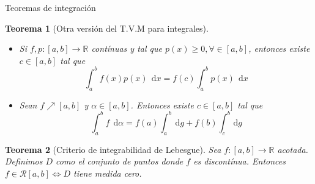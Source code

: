 \documentclass[a4paper]{article}\usepackage{/home/alonso/Documents/Projects/formularios/styles}
\theoremstyle{mytheoremstyle}
\newtheorem{theorem}{Teorema}
\newcommand{\R}{\mathbb{R}}
\newcommand{\1}{\mathds{1}}
\newcommand{\diff}[1]{\,\mathrm{d}#1}
\begin{document}
\begin{multicols*}{3}
\begin{roundbox}{Teoremas de integración}
	\begin{theorem}[Otra versión del T.V.M para integrales]
		\begin{itemize}
			\item Si $ f,p : [a,b] \to \R  $ contínuas y tal que $ p(x) \geq 0, \forall \in [a,b] $, entonces existe $ c \in [a,b] $ tal que
				\[
					\int_{a}^{b} f(x) p(x) \; \diff{x} = f(c) \int_{a}^{b} p(x) \; \diff{x}
				\]
			\item Sean $  f \nearrow [a,b] $ y $ \alpha \in [a,b] $. Entonces existe $ c \in [a,b] $ tal que
				\[
					\int_{a}^{b} f \; \diff{\alpha} = f(a) \int_{a}^{b}  \diff{g}  + f(b) \int_{c}^{b}  \diff{g}
				\]
		\end{itemize}
	\end{theorem}

	\begin{theorem}[Criterio de integrabilidad de Lebesgue]
		Sea $ f : [a,b] \to \R  $ acotada. Definimos $D$ como el conjunto de puntos donde $ f $ es discontínua.
		Entonces $ f \in \mathcal{R} [a,b] \iff D $ tiene medida cero.
	\end{theorem}
\end{roundbox}

\end{multicols*}
\end{document}
